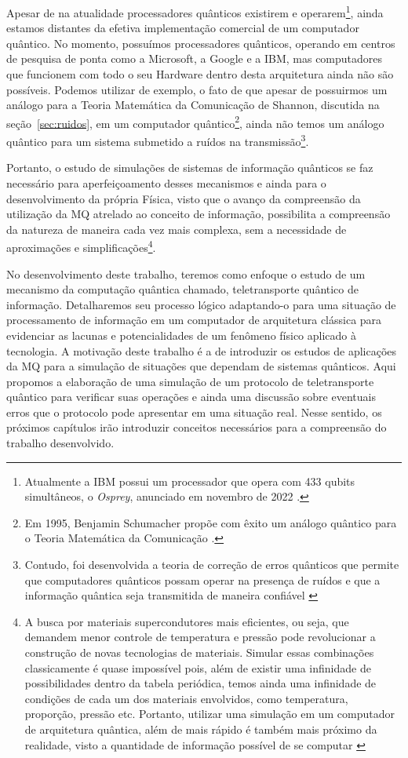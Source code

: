 Apesar de na atualidade processadores quânticos existirem e operarem\footnote{Atualmente a IBM possui um processador que opera com 433 qubits simultâneos, o \textit{Osprey}, anunciado em novembro de 2022 \cite{osprey}.}, ainda estamos distantes da efetiva implementação comercial de um computador quântico. No momento, possuímos processadores quânticos, operando em centros de pesquisa de ponta como a Microsoft, a Google e a IBM, mas computadores que funcionem com todo o seu Hardware dentro desta arquitetura ainda não são possíveis. Podemos utilizar de exemplo, o fato de que apesar de possuirmos um análogo para a Teoria Matemática da Comunicação de Shannon, discutida na seção~\ref{sec:ruidos}, em um computador quântico\footnote{Em 1995, Benjamin Schumacher propõe com êxito um análogo quântico para o Teoria Matemática da Comunicação \cite{benschu}.}, ainda não temos um análogo quântico para um sistema submetido a ruídos na transmissão\footnote{Contudo, foi desenvolvida a teoria de correção de erros quânticos que permite que computadores quânticos possam operar na presença de ruídos e que a informação quântica seja transmitida de maneira confiável \cite{chuang}}\cite{chuang}.

Portanto, o estudo de simulações de sistemas de informação quânticos se faz necessário para aperfeiçoamento desses mecanismos e ainda para o desenvolvimento da própria Física, visto que o avanço da compreensão da utilização da MQ atrelado ao conceito de informação, possibilita a compreensão da natureza de maneira cada vez mais complexa, sem a necessidade de aproximações e simplificações\footnote{A busca por materiais supercondutores mais eficientes, ou seja, que demandem menor controle de temperatura e pressão pode revolucionar a construção de novas tecnologias de materiais. Simular essas combinações classicamente é quase impossível pois, além de existir uma infinidade de possibilidades dentro da tabela periódica, temos ainda uma infinidade de condições de cada um dos materiais envolvidos, como temperatura, proporção, pressão etc. Portanto, utilizar uma simulação em um computador de arquitetura quântica, além de mais rápido é também mais próximo da realidade, visto a quantidade de informação possível de se computar \cite{videoyoutube}}\cite{videoyoutube}.

No desenvolvimento deste trabalho, teremos como enfoque o estudo de um mecanismo da computação quântica chamado, teletransporte quântico de informação. Detalharemos seu processo lógico adaptando-o para uma situação de processamento de informação em um computador de arquitetura clássica para evidenciar as lacunas e potencialidades de um fenômeno físico aplicado à tecnologia. 
A motivação deste trabalho é a de introduzir os estudos de aplicações da MQ para a simulação de situações que dependam de sistemas quânticos. Aqui propomos a elaboração de uma simulação de um protocolo de teletransporte quântico para verificar suas operações e ainda uma discussão sobre eventuais erros que o protocolo pode apresentar em uma situação real. Nesse sentido, os próximos capítulos irão introduzir conceitos necessários para a compreensão do trabalho desenvolvido.
 
